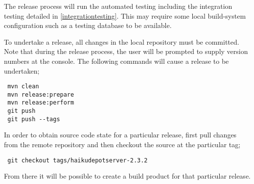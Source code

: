  The release process will run the automated testing including the integration testing detailed in \ref{integrationtesting}.  This may require some local build-system configuration such as a testing database to be available.

 To undertake a release, all changes in the local repository must be committed.  Note that during the release process, the user will be prompted to supply version numbers at the console.  The following commands will cause a release to be undertaken;

 \begin{verbatim}
 mvn clean
 mvn release:prepare
 mvn release:perform
 git push
 git push --tags
 \end{verbatim}

 In order to obtain source code state for a particular release, first pull changes from the remote repository and then checkout the source at the particular tag;

 \begin{verbatim}
 git checkout tags/haikudepotserver-2.3.2
 \end{verbatim}

 From there it will be possible to create a build product for that particular release.